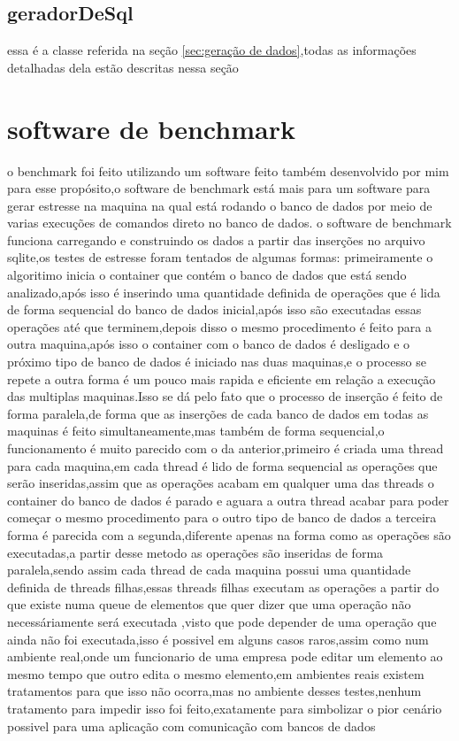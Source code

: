 \documentclass[
	12pt,				%
	openright,			%
	oneside,			%
	a4paper,			%
	english,			%
	french,				%
	spanish,			%
	brazil,				%
	]{abntex2}
\begin{document}
\subsection{geradorDeSql}
\label{subsec:geradorDeSql}
essa é a classe referida na seção \autoref{sec:geração de dados},todas as informações detalhadas dela estão descritas nessa seção

\section{software de benchmark}
\label{sec:software de benchmark}
o benchmark foi feito utilizando um software feito também desenvolvido por mim para esse propósito,o software de benchmark está mais para um software para gerar estresse na maquina na qual está rodando o banco de dados por meio de varias execuções de comandos direto no banco de dados.
o software de benchmark funciona carregando e construindo os dados a partir das inserções no arquivo sqlite,os testes de estresse foram tentados de algumas formas:
primeiramente o algoritimo inicia o container que contém o banco de dados que está sendo analizado,após isso é inserindo uma quantidade definida de operações que é lida de forma sequencial do banco de dados inicial,após isso são executadas essas operações até que terminem,depois disso o mesmo procedimento é feito para a outra maquina,após isso o container com o banco de dados é desligado e o próximo tipo de banco de dados é iniciado nas duas maquinas,e o processo se repete
a outra forma é um pouco mais rapida e eficiente em relação a execução das multiplas maquinas.Isso se dá pelo fato que o processo de inserção é feito de forma paralela,de forma que as inserções de cada banco de dados em todas as maquinas é feito simultaneamente,mas também de forma sequencial,o funcionamento é muito parecido com o da anterior,primeiro é criada uma thread para cada maquina,em cada thread é lido de forma sequencial as operações que serão inseridas,assim que as operações acabam em qualquer uma das threads o container do banco de dados é parado e aguara a outra thread acabar para poder começar o mesmo procedimento para o outro tipo de banco de dados
a terceira forma é parecida com a segunda,diferente apenas na forma como as operações são executadas,a partir desse metodo as operações são inseridas de forma paralela,sendo assim cada thread de cada maquina possui uma quantidade definida de threads filhas,essas threads filhas executam as operações a partir do que existe numa queue de elementos que quer dizer que uma operação não necessáriamente será executada ,visto que pode depender de uma operação que ainda não foi executada,isso é possivel em alguns casos raros,assim como num ambiente real,onde um funcionario de uma empresa pode editar um elemento ao mesmo tempo que outro edita o mesmo elemento,em ambientes reais existem tratamentos para que isso não ocorra,mas no ambiente desses testes,nenhum tratamento para impedir isso foi feito,exatamente para simbolizar o pior cenário possivel para uma aplicação com comunicação com bancos de dados
\end{document}
